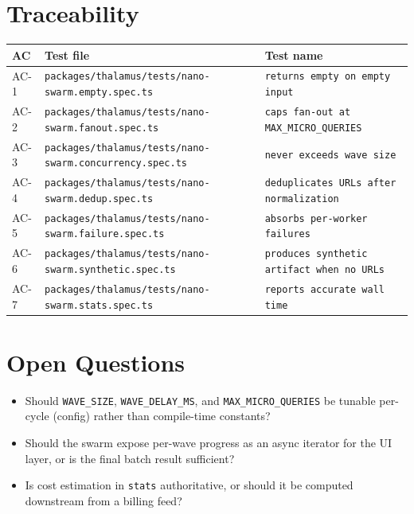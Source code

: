 \section{Traceability}

\begin{center}
\begin{tabular}{@{}lll@{}}
\toprule
AC & Test file & Test name \\
\midrule
AC-1 & \texttt{packages/thalamus/tests/nano-swarm.empty.spec.ts} & \texttt{returns empty on empty input} \\
AC-2 & \texttt{packages/thalamus/tests/nano-swarm.fanout.spec.ts} & \texttt{caps fan-out at MAX\_MICRO\_QUERIES} \\
AC-3 & \texttt{packages/thalamus/tests/nano-swarm.concurrency.spec.ts} & \texttt{never exceeds wave size} \\
AC-4 & \texttt{packages/thalamus/tests/nano-swarm.dedup.spec.ts} & \texttt{deduplicates URLs after normalization} \\
AC-5 & \texttt{packages/thalamus/tests/nano-swarm.failure.spec.ts} & \texttt{absorbs per-worker failures} \\
AC-6 & \texttt{packages/thalamus/tests/nano-swarm.synthetic.spec.ts} & \texttt{produces synthetic artifact when no URLs} \\
AC-7 & \texttt{packages/thalamus/tests/nano-swarm.stats.spec.ts} & \texttt{reports accurate wall time} \\
\bottomrule
\end{tabular}
\end{center}

\section{Open Questions}
\begin{itemize}[leftmargin=1.2em]
  \item Should \texttt{WAVE\_SIZE}, \texttt{WAVE\_DELAY\_MS}, and \texttt{MAX\_MICRO\_QUERIES} be tunable per-cycle (config) rather than compile-time constants?
  \item Should the swarm expose per-wave progress as an async iterator for the UI layer, or is the final batch result sufficient?
  \item Is cost estimation in \texttt{stats} authoritative, or should it be computed downstream from a billing feed?
\end{itemize}


